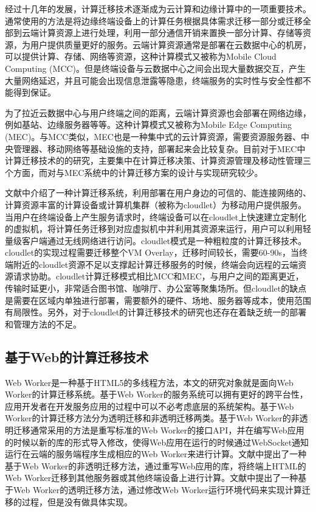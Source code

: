 经过十几年的发展，计算迁移技术逐渐成为云计算和边缘计算中的一项重要技术\cite{崔勇2017移动云计算研究进展与趋势}。通常使用的方法是将边缘终端设备上的计算任务根据具体需求迁移一部分或迁移全部到云端计算资源上进行处理，利用一部分通信开销来置换一部分计算、存储等资源，为用户提供质量更好的服务\cite{徐乃凡2018面向边缘云高效能的移动终端计算迁移方法}。云端计算资源通常是部署在云数据中心的机房，可以提供计算、存储、网络等资源，这种计算模式又被称为Mobile Cloud Computing (MCC)\cite{barbarossa2014communicating}。但是终端设备与云数据中心之间会出现大量数据交互，产生大量网络延迟，并且可能会出现信息泄露等隐患，终端服务的实时性与安全性都不能得到保证\cite{shi2016edge}。

为了拉近云数据中心与用户终端之间的距离，云端计算资源也会部署在网络边缘，例如基站、边缘服务器等等。这种计算模式又被称为Mobile Edge Computing (MEC)\cite{董浩2019移动边缘计算环境下服务工作流的计算卸载,mach2017mobile}。与MCC类似，MEC也是一种集中式的云计算资源，需要资源服务器、中央管理器、移动网络等基础设施的支持，部署起来会比较复杂。目前对于MEC中计算迁移技术的的研究，主要集中在计算迁移决策、计算资源管理及移动性管理三个方面，而对与MEC系统中的计算迁移方案的设计与实现研究较少\cite{谢人超2018移动边缘计算卸载技术综述}。

文献\cite{satyanarayanan2009case}中介绍了一种计算迁移系统，利用部署在用户身边的可信的、能连接网络的、计算资源丰富的计算设备或计算机集群（被称为cloudlet）为移动用户提供服务。当用户在终端设备上产生服务请求时，终端设备可以在cloudlet上快速建立定制化的虚拟机，将计算任务迁移到对应虚拟机中并利用其资源来运行，用户可以利用轻量级客户端通过无线网络进行访问\cite{verbelen2012cloudlets}。cloudlet模式是一种粗粒度的计算迁移技术\cite{谢人超2018移动边缘计算卸载技术综述}。cloudlet的实现过程需要迁移整个VM Overlay，迁移时间较长，需要60-90s，当终端附近的cloudlet资源不足以支撑起计算迁移服务的时候，终端会向远程的云端资源请求协助\cite{张文丽2016智能移动终端计算迁移研究}。cloudlet计算迁移模式相比MCC和MEC，与用户之间的距离更近，传输时延更小，非常适合图书馆、咖啡厅、办公室等聚集场所。但cloudlet的缺点是需要在区域内单独进行部署，需要额外的硬件、场地、服务器等成本，使用范围有局限性\cite{li2014can,zhang2018hybrid}。另外，对于cloudlet的计算迁移技术的研究也还存在着缺乏统一的部署和管理方法的不足\cite{张文丽2016智能移动终端计算迁移研究}。
\subsection{基于Web的计算迁移技术}
Web Worker是一种基于HTML5的多线程方法，本文的研究对象就是面向Web Worker的计算迁移系统。基于Web Worker的服务系统可以拥有更好的跨平台性，应用开发者在开发服务应用的过程中可以不必考虑底层的系统架构\cite{王硕2016嵌入式}。基于Web Worker的计算迁移方法分为透明迁移和非透明迁移两类\cite{wang2018html5}。基于Web Worker的非透明迁移通常采用的方法是重写标准的Web Worker的接口API，并在编写Web应用的时候以新的库的形式导入修改，使得Web应用在运行的时候通过WebSocket通知运行在云端的服务端程序生成相应的Web Worker来进行计算\cite{zbierski2014bring,hwang2014wwf,hwang2014cloud,gong2016wwof,kurumatani2012executing}。文献\cite{王昭2018Web}中提出了一种基于Web Worker的非透明迁移方法，通过重写Web应用的库，将终端上HTML的Web Worker迁移到其他服务器或其他终端设备上进行计算。文献\cite{zhang2010elastic}中提出了一种基于Web Worker的透明迁移方法，通过修改Web Worker运行环境代码来实现计算迁移的过程，但是没有做具体实现。

